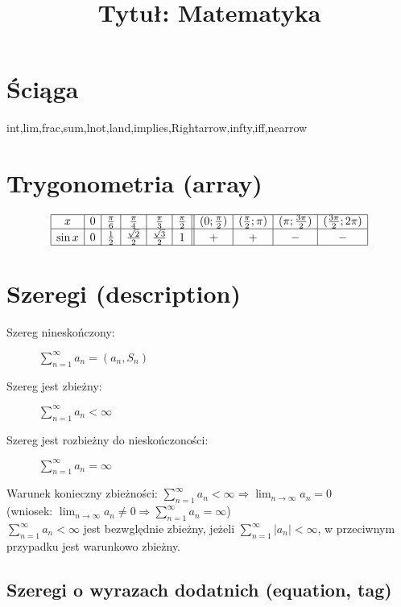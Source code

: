 \documentclass[12pt]{article}
\title{Tytuł: Matematyka}
\date{}
\begin{document}
\maketitle

\section*{Ściąga}

int,lim,frac,sum,lnot,land,implies,Rightarrow,infty,iff,nearrow

\section{Trygonometria (array)}

\[
	\begin{array}{|c|c|c|c|c|c||c|c|c|c|}
		\hline
		x & 0 & \frac{\pi}{6} & \frac{\pi}{4} & \frac{\pi}{3} & \frac{\pi}{2} &
		(0; \frac{\pi}{2}) & (\frac{\pi}{2};\pi) & (\pi;\frac{3\pi}{2}) & (\frac{3\pi}{2}; 2\pi)\\
		\hline
		\sin x & 0 & \frac{1}{2} & \frac{\sqrt{2}}{2} & \frac{\sqrt{3}}{2} & 1 & + & + & - & -\\
		\hline
	\end{array}
\]

\section{Szeregi (description)}

\begin{description}
	\item[Szereg nineskończony:] $\displaystyle \sum_{n=1}^\infty a_n = (a_n, S_n)$
	\item[Szereg jest zbieżny:] $\displaystyle \sum_{n=1}^\infty a_n < \infty$
	\item[Szereg jest rozbieżny do nieskończoności:] $\displaystyle \sum_{n=1}^\infty a_n = \infty$
\end{description}

\noindent Warunek konieczny zbieżności: $\sum_{n=1}^\infty a_n < \infty \Rightarrow \lim_{n \to \infty} a_n = 0$ \\
(wniosek: $\lim_{n \to \infty} a_n \neq 0 \Rightarrow \displaystyle \sum_{n=1}^\infty a_n = \infty$) \\
$\displaystyle \sum_{n=1}^\infty a_n < \infty$ jest bezwględnie zbieżny, 
jeżeli $\displaystyle \sum_{n=1}^\infty |a_n| < \infty$, 
w przeciwnym przypadku jest warunkowo zbieżny.

\subsection{Szeregi o wyrazach dodatnich (equation, tag)}
\end{document}
